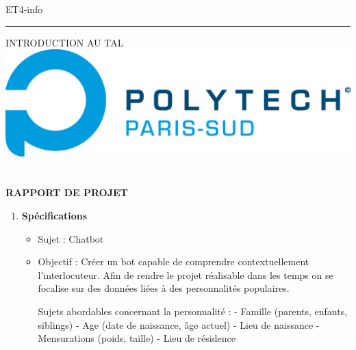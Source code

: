 \documentclass[french,12pt]{article}
\begin{document}
 

ET4-info

\rule{5cm}{0.1pt} 

INTRODUCTION AU TAL
\hfill
\includegraphics[scale=0.4]{pps.jpg} \\\\\\
\center \textbf{RAPPORT DE PROJET} 
\bigbreak

\begin{enumerate}
\item \textbf{Spécifications}
\bigbreak
\raggedright
\setlength{\parindent}{0,5cm}

\begin{itemize}
\item Sujet : Chatbot



\item Objectif : Créer un bot capable de comprendre contextuellement l’interlocuteur. Afin de rendre le projet réalisable dans les temps on se focalise sur des données liées à des personnalités populaires.

Sujets abordables concernant la personnalité :
-       Famille (parents, enfants, siblings)
-       Age (date de naissance, âge actuel)
-       Lieu de naissance
-       Mensurations (poids, taille)
-    	Lieu de résidence


\end{itemize}
\end{enumerate}
\end{document}
